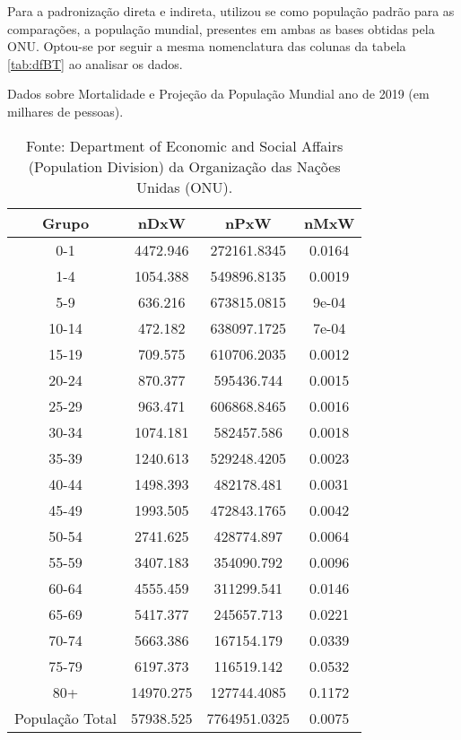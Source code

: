 Para a padronização direta e indireta, utilizou se como população padrão para as comparações, a população mundial, presentes em ambas as bases obtidas pela ONU. Optou-se por seguir a mesma nomenclatura das colunas da tabela \ref{tab:dfBT} ao analisar os dados.

\begin{table}[H]
\centering
\captionsetup{justification=raggedright,singlelinecheck=false}
  \caption{Dados sobre Mortalidade e Projeção da População Mundial ano de 2019 (em milhares de pessoas).}
    \label{tab:dfW}
\begin{tabular}{cccc}
    \hline
    Grupo & nDxW & nPxW & nMxW \\
    \hline
0-1    &  4472.946  &  272161.8345  &  0.0164 \\
1-4    &  1054.388  &  549896.8135  &  0.0019 \\
5-9    &  636.216   &  673815.0815  &  9e-04  \\
10-14  &  472.182   &  638097.1725  &  7e-04  \\[4pt]
15-19  &  709.575   &  610706.2035  &  0.0012 \\
20-24  &  870.377   &  595436.744   &  0.0015  \\
25-29  &  963.471   &  606868.8465  &  0.0016  \\
30-34  &  1074.181  &  582457.586   &  0.0018  \\[4pt]
35-39  &  1240.613  &  529248.4205  &  0.0023  \\
40-44  &  1498.393  &  482178.481   & 0.0031   \\
45-49  &  1993.505  &  472843.1765  & 0.0042   \\
50-54  &  2741.625  &  428774.897   &  0.0064   \\[4pt]
55-59  &  3407.183  &  354090.792   &  0.0096   \\
60-64  &  4555.459  &  311299.541   &  0.0146   \\
65-69  &  5417.377  &  245657.713   &  0.0221   \\
70-74  &  5663.386  &  167154.179   &  0.0339   \\[4pt]
75-79  &  6197.373  &  116519.142   &  0.0532   \\
80+    &  14970.275 & 127744.4085   &  0.1172   \\
População Total  &  57938.525 & 7764951.0325  & 0.0075 \\
\hline
\end{tabular}
\caption*{Fonte: Department of Economic and Social Affairs (Population Division) da Organização das Nações Unidas (ONU).}
\end{table}


